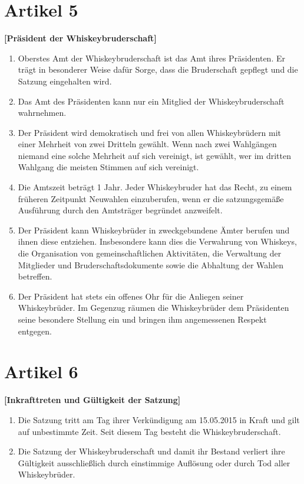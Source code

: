 \documentclass[a4paper,12pt]{scrartcl}
\begin{document}
\section{Artikel 5}
\label{sec:präsident}
\textbf{[Präsident der Whiskeybruderschaft]}

\begin{enumerate}

\item Oberstes Amt der Whiskeybruderschaft ist das Amt ihres Präsidenten. Er trägt in besonderer
  Weise dafür Sorge, dass die Bruderschaft gepflegt und die Satzung eingehalten wird.

\item Das Amt des Präsidenten kann nur ein Mitglied der Whiskeybruderschaft wahrnehmen.

\item Der Präsident wird demokratisch und frei von allen Whiskeybrüdern mit einer Mehrheit von zwei
  Dritteln gewählt. Wenn nach zwei Wahlgängen niemand eine solche Mehrheit auf sich vereinigt, ist
  gewählt, wer im dritten Wahlgang die meisten Stimmen auf sich vereinigt.

\item Die Amtszeit beträgt 1 Jahr. Jeder Whiskeybruder hat das Recht, zu einem früheren Zeitpunkt
  Neuwahlen einzuberufen, wenn er die satzungsgemäße Ausführung durch den Amtsträger begründet
  anzweifelt.

\item Der Präsident kann Whiskeybrüder in zweckgebundene Ämter berufen und ihnen diese entziehen.
  Insbesondere kann dies die Verwahrung von Whiskeys, die Organisation von gemeinschaftlichen
  Aktivitäten, die Verwaltung der Mitglieder und Bruderschaftsdokumente sowie die Abhaltung der
  Wahlen betreffen.

\item Der Präsident hat stets ein offenes Ohr für die Anliegen seiner Whiskeybrüder. Im Gegenzug
  räumen die Whiskeybrüder dem Präsidenten seine besondere Stellung ein und bringen ihm angemessenen
  Respekt entgegen.

\end{enumerate}



\section{Artikel 6}
\label{sec:gültigkeit}
\textbf{[Inkrafttreten und Gültigkeit der Satzung]}

\begin{enumerate}

\item Die Satzung tritt am Tag ihrer Verkündigung am 15.05.2015 in Kraft und gilt auf unbestimmte
  Zeit. Seit diesem Tag besteht die Whiskeybruderschaft.

\item Die Satzung der Whiskeybruderschaft und damit ihr Bestand verliert ihre Gültigkeit
  ausschließlich durch einstimmige Auflösung oder durch Tod aller Whiskeybrüder.

\end{enumerate}
\end{document}
